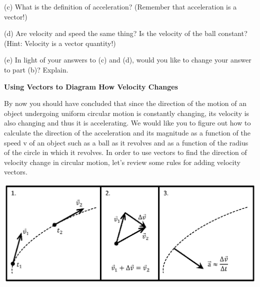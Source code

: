 (c) What is the definition of acceleration? (Remember that acceleration is a
vector!)
\answerspace{20mm}

(d) Are velocity and speed the same thing? Is the velocity of the ball constant?
(Hint: Velocity is a vector quantity!)
\answerspace{20mm}

(e) In light of your answers to (c) and (d), would you like to change your answer
to part (b)? Explain.
\answerspace{20mm}

\textbf{Using Vectors to Diagram How Velocity Changes} 

By now you should have concluded that since the direction of the motion of an
object undergoing uniform circular motion is constantly changing, its velocity
is also changing and thus it is accelerating. We would like you to figure out
how to calculate the direction of the acceleration and its magnitude as a function
of the speed v of an object such as a ball as it revolves and as a function
of the radius of the circle in which it revolves. In order to use vectors to
find the direction of velocity change in circular motion, let's review some
rules for adding velocity vectors.

{\par\centering \includegraphics{circ_motion/circ_motion_fig1_new.eps} \par}

